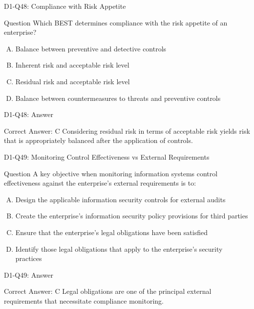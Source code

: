 \documentclass{beamer}
\begin{document}
	\begin{frame}{D1-Q48: Compliance with Risk Appetite}
		\begin{block}{Question}
			Which BEST determines compliance with the risk appetite of an enterprise?
		\end{block}
		\begin{enumerate}[(A)]
			\item Balance between preventive and detective controls
			\item Inherent risk and acceptable risk level
			\item Residual risk and acceptable risk level
			\item Balance between countermeasures to threats and preventive controls
		\end{enumerate}
	\end{frame}
	\begin{frame}{D1-Q48: Answer}
		\begin{block}{Correct Answer: C}
			Considering residual risk in terms of acceptable risk yields risk that is appropriately balanced after the application of controls.
		\end{block}
	\end{frame}
	
	\begin{frame}{D1-Q49: Monitoring Control Effectiveness vs External Requirements}
		\begin{block}{Question}
			A key objective when monitoring information systems control effectiveness against the enterprise's external requirements is to:
		\end{block}
		\begin{enumerate}[(A)]
			\item Design the applicable information security controls for external audits
			\item Create the enterprise's information security policy provisions for third parties
			\item Ensure that the enterprise's legal obligations have been satisfied
			\item Identify those legal obligations that apply to the enterprise's security practices
		\end{enumerate}
	\end{frame}
	\begin{frame}{D1-Q49: Answer}
		\begin{block}{Correct Answer: C}
			Legal obligations are one of the principal external requirements that necessitate compliance monitoring.
		\end{block}
	\end{frame}
	
\end{document}
